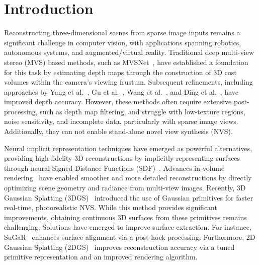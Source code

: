 \section{Introduction}
\label{sec:intro}
\vspace{-5pt}
Reconstructing three-dimensional scenes from sparse image inputs remains a significant challenge in computer vision, with applications spanning robotics, autonomous systems, and augmented/virtual reality. Traditional deep multi-view stereo (MVS) based methods, such as MVSNet~\cite{yao2018mvsnet}, have established a foundation for this task by estimating depth maps through the construction of 3D cost volumes within the camera's viewing frustum. Subsequent refinements, including approaches by Yang et al.~\cite{yang2020cost}, Gu et al.~\cite{gu2020cascade}, Wang et al.~\cite{wang2021patchmatchnet}, and Ding et al.~\cite{ding2022transmvsnet}, have improved depth accuracy. However, these methods often require extensive post-processing, such as depth map filtering, and struggle with low-texture regions, noise sensitivity, and incomplete data, particularly with sparse image views. Additionally, they can not enable stand-alone novel view synthesis (NVS).

Neural implicit representation techniques have emerged as powerful alternatives, providing high-fidelity 3D reconstructions by implicitly representing surfaces through neural Signed Distance Functions (SDF)~\cite{park2019deepsdf}. Advances in volume rendering~\cite{yariv2021volume, wang2021neus, oechsle2021unisurf, niemeyer2020differentiable, darmon2022improving} have enabled smoother and more detailed reconstructions by directly optimizing scene geometry and radiance from multi-view images. Recently, 3D Gaussian Splatting (3DGS)~\cite{kerbl20233d} introduced the use of Gaussian primitives for faster real-time, photorealistic NVS. While this method provides significant improvements, obtaining continuous 3D surfaces from these primitives remains challenging. Solutions have emerged to improve surface extraction. For instance,  SuGaR~\cite{guedon2024sugar} enhances surface alignment via a post-hock processing. Furthermore, 2D Gaussian Splatting (2DGS)~\cite{huang20242d}  improves reconstruction accuracy via a tuned primitive representation and an improved rendering algorithm.

